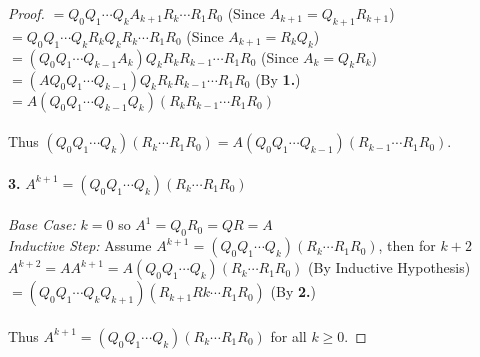 \documentclass[12pt]{article}
\begin{document}
\begin{proof}
    \indent $= Q_0 Q_1 \cdots Q_k A_{k+1} R_k \cdots R_1 R_0$ (Since $A_{k+1} = Q_{k+1} R_{k+1}$) \\
    \indent $= Q_0 Q_1 \cdots Q_k R_k Q_k R_k \cdots R_1 R_0$ (Since $A_{k+1} = R_k Q_k$) \\
    \indent $= (Q_0 Q_1 \cdots Q_{k-1} A_k) Q_k R_k R_{k-1} \cdots R_1 R_0$ (Since $A_k = Q_k R_k$) \\
    \indent $= (AQ_0 Q_1 \cdots Q_{k-1}) Q_k R_k R_{k-1} \cdots R_1 R_0$ (By \textbf{1.}) \\
    \indent $= A(Q_0 Q_1 \cdots Q_{k-1} Q_k) (R_k R_{k-1} \cdots R_1 R_0)$ \\ \\
    Thus $(Q_0 Q_1 \cdots Q_k)(R_k \cdots R_1 R_0) = A(Q_0 Q_1 \cdots Q_{k-1})(R_{k-1} \cdots R_1 R_0)$. \\ \\
    \textbf{3.} $A^{k+1} = (Q_0 Q_1 \cdots Q_k) (R_k \cdots R_1 R_0)$ \\ \\
    \textit{Base Case:} $k = 0$ so $A^1 = Q_0 R_0 = QR = A$ \\
    \textit{Inductive Step:} Assume $A^{k+1} = (Q_0 Q_1 \cdots Q_k) (R_k \cdots R_1 R_0)$, then for $k+2$ \\
    \indent $A^{k+2} = A A^{k+1} = A (Q_0 Q_1 \cdots Q_k) (R_k \cdots R_1 R_0)$ (By Inductive Hypothesis) \\
    \indent $= (Q_0 Q_1 \cdots Q_kQ_{k+1})(R_{k+1}R{k} \cdots R_1 R_0)$ (By \textbf{2.}) \\ \\
    Thus $A^{k+1} = (Q_0 Q_1 \cdots Q_k) (R_k \cdots R_1 R_0)$ for all $k \geq 0$.
\end{proof}
\end{document}
